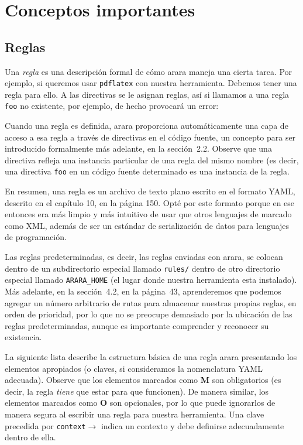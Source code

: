 \documentclass{memoir}
\begin{document}
	\chapter{Conceptos importantes}
	\section{Reglas}
	Una \emph{regla} es una descripción formal de cómo arara maneja una cierta tarea. Por ejemplo, si queremos usar \texttt{pdflatex} con nuestra herramienta. Debemos tener una regla para ello. A las directivas se le asignan reglas, así si llamamos a una regla \texttt{foo} no existente, por ejemplo, de hecho provocará un error:
	
	Cuando una regla es definida, arara proporciona automáticamente una capa de acceso a esa regla a través de directivas en el código fuente, un concepto para ser introducido formalmente más adelante, en la sección~2.2. Observe que una directiva refleja una instancia particular de una regla del mismo nombre (es decir, una directiva \texttt{foo} en un código fuente determinado es una instancia de la regla.
	
	En resumen, una regla es un archivo de texto plano escrito en el formato YAML, descrito en el capítulo 10, en la página 150. Opté por este formato porque en ese entonces era más limpio y más intuitivo de usar que otros lenguajes de marcado como XML, además de ser un estándar de serialización de datos para lenguajes de programación.
	
	Las reglas predeterminadas, es decir, las reglas enviadas con arara, se colocan dentro de un subdirectorio especial llamado \texttt{rules/} dentro de otro directorio especial llamado  \texttt{{ARARA\_HOME}} (el lugar donde nuestra herramienta esta instalado). Más adelante, en la sección~4.2, en la página~43, aprenderemos que podemos agregar un número arbitrario de rutas para almacenar nuestras propias reglas, en orden de prioridad, por lo que no se preocupe demasiado por la ubicación de las reglas predeterminadas, aunque es importante comprender y reconocer su existencia.
	
	La siguiente lista describe la estructura básica de una regla arara presentando los elementos apropiados (o claves, si consideramos la nomenclatura YAML adecuada). Observe que los elementos marcados como \textbf{M} son obligatorios (es decir, la regla \emph {tiene} que estar para que funcionen). De manera similar, los elementos marcados como \textbf{O} son opcionales, por lo que puede ignorarlos de manera segura al escribir una regla para nuestra herramienta. Una clave precedida por \texttt{context}$\rightarrow$ indica un contexto y debe definirse adecuadamente dentro de ella.
	
\end{document}
